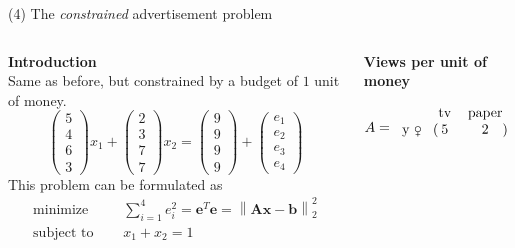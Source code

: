 \documentclass[11pt, aspectratio=149]{beamer}
\theoremstyle{plain}
\newcommand{\norm}[1]{\left\lVert#1\right\rVert}
\begin{document}
\begin{frame}[fragile, t]{(4) The \emph{constrained} advertisement problem}
	\begin{columns}
		\begin{column}{0.6\textwidth}
			\textbf{Introduction}\\ \vspace*{0.5em} 
			Same as before, but constrained by a budget of $1$ unit of money.
			\begin{equation*}
			\begin{pmatrix}
			5\\ 
			4\\ 
			6\\ 
			3
			\end{pmatrix}
			x_1
			+
			\begin{pmatrix}
			2\\ 
			3\\ 
			7\\ 
			7
			\end{pmatrix}
			x_2
			=
			\begin{pmatrix}
			9 \\ 
			9\\ 
			9\\ 
			9
			\end{pmatrix}
			+
			\begin{pmatrix}
			e_1 \\ 
			e_2\\ 
			e_3\\ 
			e_4
			\end{pmatrix}
			\end{equation*}
			This problem can be formulated as
			\begin{align*}
			\text{minimize } \quad & \sum_{i=1}^{4} e_i^2 = 
			\mathbf{e}^T \mathbf{e}
			=
			\norm{ \mathbf{A} \mathbf{x} - \mathbf{b} }_2^2 \\
			\text{subject to } \quad & x_1 + x_2 = 1 
			\end{align*}
		\end{column}
		\begin{column}{0.4\textwidth}%
			\begin{center}
				\textbf{Views per unit of money}
			\end{center}
			\[
			A = 
			\begin{blockarray}{rcc}
			& \text{tv} & \text{paper}  \\
			\begin{block}{r(cc)}
			\text{y \female}  & 5 &  2 \\

\end{block}
\end{blockarray}\]
\end{column}
\end{columns}
\end{frame}
\end{document}
